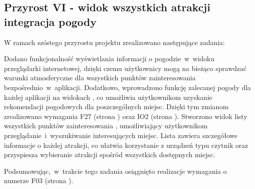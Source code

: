 
    \subsection{Przyrost VI - widok wszystkich atrakcji integracja pogody}
    \label{sec:przyrost6}

    W ramach szóstego przyrostu projektu zrealizowano następujące zadania:
  
    \indent Dodano funkcjonalność wyświetlania informacji o pogodzie~w~widoku 
    przeglądarki internetowej, dzięki czemu użytkownicy mogą na bieżąco sprawdzać warunki atmosferyczne dla wszystkich punktów zainteresowania bezpośrednio~w~aplikacji. 
    Dodatkowo, wprowadzono funkcję zalecanej pogody dla każdej aplikacji na widokach , 
    co umożliwia użytkownikom uzyskanie rekomendacji pogodowych dla poszczególnych miejsc. Dzięki tym zmianom zrealizowano wymagania F27 (strona \pageref{tab:requirements:func27}) oraz IO2 (strona \pageref{tab:requirements:env2}).
    \indent Stworzono widok listy wszystkich punktów zainteresowania , umożliwiający użytkownikom 
    przeglądanie~i~wyszukiwanie interesujących miejsc. Lista zawiera szczegółowe informacje 
    o każdej atrakcji, co ułatwia korzystanie z urządzeń 
    typu czytnik oraz przyspiesza wybieranie atrakcji spośród wszystkich dostępnych miejsc. 
    
    Podsumowując,~w~trakcie tego zadania osiągnięto realizacje wymagania o numerze F03 (strona \pageref{tab:requirements:func3}).


